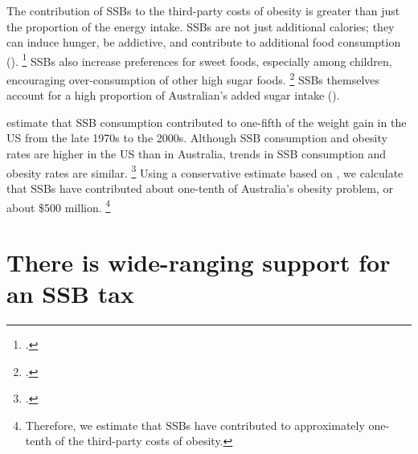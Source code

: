 \documentclass[embargoed]{grattan}
\begin{document}
The contribution of SSBs to the third-party costs of obesity is greater than just the proportion of the energy intake.
SSBs are not just additional calories; they can induce hunger, be addictive, and contribute to additional food consumption ().%
\footcites{Vartanian2007Effectssoftdrink}{Lennerz2013Effectsdietaryglycemic}{Schulte2015Currentconsiderationsregarding}{Fortuna2012obesityepidemicfood}{Popkin2012Sugarybeveragesrepresent}{Panel2014POLICYBRIEFoptions} SSBs also increase preferences for sweet foods, especially among children, encouraging over-consumption of other high sugar foods.%
\footcite{Popkin2012Sugarybeveragesrepresent} SSBs themselves account for a high proportion of Australian's added sugar intake ().

\textcite{Woodward-Lopez2010whatextenthave} estimate that SSB consumption contributed to one-fifth of the weight gain in the US from the late 1970s to the 2000s.
Although SSB consumption and obesity rates are higher in the US than in Australia, trends in SSB consumption and obesity rates are similar.%
\footcites{Popkin2016Sweeteningglobaldiet}{Silver2015IdBuyEmerging} Using a conservative estimate based on \textcite{Woodward-Lopez2010whatextenthave}, we calculate that SSBs have contributed about one-tenth of Australia's obesity problem, or about \$500 million.%
\footnote{Therefore, we estimate that SSBs have contributed to approximately one-tenth of the third-party costs of obesity.}

\section{There is wide-ranging support for an SSB tax}\label{there-is-wide-ranging-support-for-an-ssb-tax}
\end{document}
